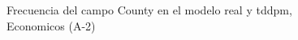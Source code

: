 \begin{figure}[H]
    \centering
    
    \caption{Frecuencia del campo County en el modelo real y tddpm, Economicos (A-2)}
    \label{frecuency-County-tddpm_mlp}
\end{figure}